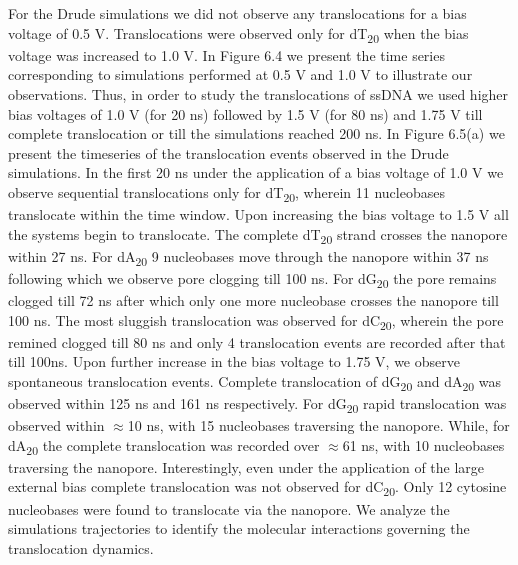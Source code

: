 For the Drude simulations we did not observe any translocations for a bias voltage of 0.5 V. Translocations were observed only for dT\textsubscript{20} when the bias voltage was increased to 1.0 V. In Figure 6.4 we present the time series corresponding to simulations performed at 0.5 V and 1.0 V to illustrate our observations. Thus, in order to study the translocations of ssDNA we used higher bias voltages of 1.0 V (for 20 ns) followed by 1.5 V (for 80 ns) and 1.75 V till complete translocation or till the simulations reached 200 ns. In Figure 6.5(a) we present the timeseries of the translocation events observed in the Drude simulations. In the first 20 ns under the application of a bias voltage of 1.0 V we observe sequential translocations only for dT\textsubscript{20}, wherein 11 nucleobases translocate within the time window. Upon increasing the bias voltage to 1.5 V all the systems begin to translocate. The complete dT\textsubscript{20} strand crosses the nanopore within 27 ns. For dA\textsubscript{20} 9 nucleobases move through the nanopore within 37 ns following which we observe pore clogging till 100 ns. For dG\textsubscript{20} the pore remains clogged till 72 ns after which only one more nucleobase crosses the nanopore till 100 ns. The most sluggish translocation was observed for dC\textsubscript{20}, wherein the pore remined clogged till 80 ns and only 4 translocation events are recorded after that till 100ns. Upon further increase in the bias voltage to 1.75 V, we observe spontaneous translocation events. Complete translocation of dG\textsubscript{20} and dA\textsubscript{20} was observed within 125 ns and 161 ns respectively. For dG\textsubscript{20} rapid translocation was observed within $\approx$10 ns, with 15 nucleobases traversing the nanopore. While, for dA\textsubscript{20} the complete translocation was recorded over $\approx$61 ns, with 10 nucleobases traversing the nanopore. Interestingly, even under the application of the large external bias complete translocation was not observed for dC\textsubscript{20}. Only 12 cytosine nucleobases were found to translocate via the nanopore. We analyze the simulations trajectories to identify the molecular interactions governing the translocation dynamics. 

